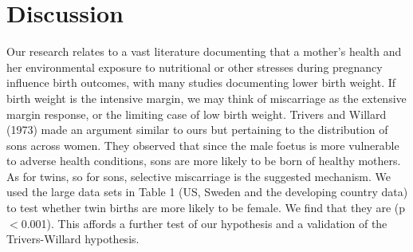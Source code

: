 \documentclass[11pt]{article}
\begin{document}
\section*{Discussion}
Our research relates to a vast literature documenting that a mother's health and her environmental exposure to nutritional or other stresses during pregnancy influence birth outcomes, with many studies documenting lower birth weight\cite{CurrieMoretti2007,Bernsteinetal2005,SerranoDomeque2014}. If birth weight is the intensive margin, we may think of miscarriage as the extensive margin response, or the limiting case of low birth weight. Trivers and Willard (1973) made an argument similar to ours but pertaining to the distribution of sons across women\cite{TriversWillard1973,AlmondEdlund2007}. They observed that since the male foetus is more vulnerable to adverse health conditions, sons are more likely to be born of healthy mothers. As for twins, so for sons, selective miscarriage is the suggested mechanism. We used the large data sets in Table 1 (US, Sweden and the developing country data) to test whether twin births are more likely to be female. We find that they are (p$<$0.001). This affords a further test of our hypothesis and a validation of the Trivers-Willard hypothesis.   

\end{document}
